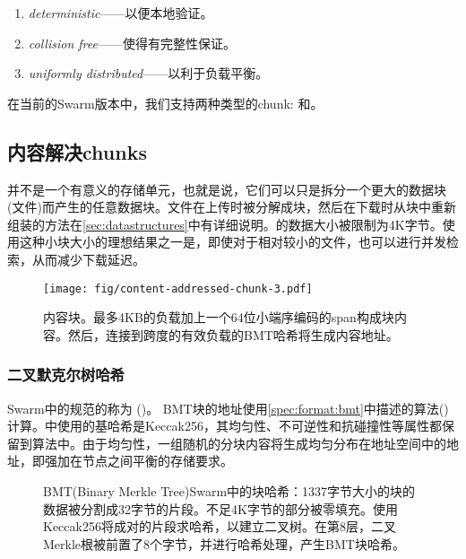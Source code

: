 \begin{enumerate}
    \item \emph{deterministic}——以便本地验证。
    \item \emph{collision free}——使得有完整性保证。
    \item \emph{uniformly distributed}——以利于负载平衡。
\end{enumerate}

在当前的Swarm版本中，我们支持两种类型的chunk: 和。 

\subsection{内容解决chunks\statusgreen}\label{sec:content-addressed-chunks}

并不是一个有意义的存储单元，也就是说，它们可以只是拆分一个更大的数据块(文件)而产生的任意数据块。文件在上传时被分解成块，然后在下载时从块中重新组装的方法在\ref{sec:datastructures}中有详细说明。的数据大小被限制为4K字节。使用这种小块大小的理想结果之一是，即使对于相对较小的文件，也可以进行并发检索，从而减少下载延迟。 

\begin{figure}[htbp]
   \centering
   \texttt{[image: fig/content-addressed-chunk-3.pdf]}
   \caption[内容解决chunk\statusgreen]{内容块。最多4KB的负载加上一个64位小端序编码的span构成块内容。然后，连接到跨度的有效负载的BMT哈希将生成内容地址。}
   \label{fig:content-addressed-chunk}
\end{figure}

\subsubsection{二叉默克尔树哈希}

Swarm中的规范的称为 ()。
BMT块的地址使用\ref{spec:format:bmt}中描述的算法()计算。中使用的基哈希是Keccak256，其均匀性、不可逆性和抗碰撞性等属性都保留到算法中。由于均匀性，一组随机的分块内容将生成均匀分布在地址空间中的地址，即强加在节点之间平衡的存储要求。
\begin{figure}[htbp]
   \centering
   \resizebox{1\textwidth}{!}{
   }
   \caption[BMT: 在Swarm中二叉默克尔树哈希用作块的哈希 \statusgreen]{
   BMT(Binary Merkle Tree)Swarm中的块哈希：1337字节大小的块的数据被分割成32字节的片段。不足4K字节的部分被零填充。使用Keccak256将成对的片段求哈希，以建立二叉树。在第8层，二叉Merkle根被前置了8个字节，并进行哈希处理，产生BMT块哈希。
   }
   \label{fig:BMT}
\end{figure}

